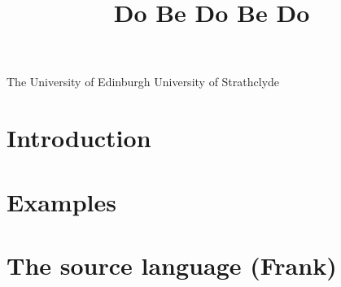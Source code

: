 \documentclass[preprint]{sigplanconf}
\begin{document}


\title{Do Be Do Be Do}

           {The University of Edinburgh}
           {}
           {University of Strathclyde}
           {}

\maketitle



\section{Introduction}
  
\section{Examples}


\section{The source language (Frank)}
\end{document}
